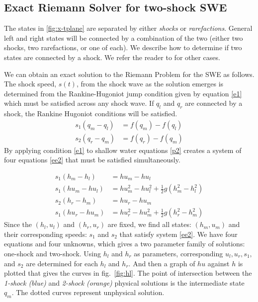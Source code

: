 \documentclass[12pt,a4paper]{article}
\begin{document}
	
	\subsection{Exact Riemann Solver for two-shock SWE}
	The states in \ref{fig:x-tplane} are separated by either {\em shocks} or {\em rarefactions}. General left and right states will be connected by a combination of the two (either two shocks, two rarefactions, or one of each).  We describe how to determine if two states are connected by a shock.  We refer the reader to \cite{leveque2002finite} for other cases. 

	We can obtain an exact solution to the Riemann Problem for the SWE as follows. 
	The shock speed, $s(t)$,  from the shock wave as the solution emerges is determined from the Rankine-Hugoniot jump condition given by equation \eqref{e1}  which must be satisfied across any shock wave.  If $q_l$ and $q_r$ are connected by a shock, the Rankine Hugoniot conditions will be satisfied. 
	\begin{equation}
	\begin{aligned}
		s_1(q_{m} - q_{l}) & = f(q_{m}) - f(q_{l}) \\
		s_2(q_{r} - q_{m}) & = f(q_{r}) - f(q_{m})
	\end{aligned}
	\label{e1}
	\end{equation}
	 By applying condition  \eqref{e1} to shallow water equations \eqref{p2}  creates a system of four equations \eqref{ee2} that must be satisfied simultaneously. 
	 
	 	\begin{equation}
	 	\begin{aligned}
	 		s_1(h_{m} - h_{l}) & = hu_{m} - hu_{l} \\
	 		s_1(hu_{m} - hu_{l})  &= hu_{m}^{2} - hu_{l}^{2} + \frac{1}{2}g(h_{m}^{2} - h_{l}^2)\\
	 		s_2(h_{r} - h_{m})  &=  hu_{r} - hu_{m}\\
	 		s_1(hu_{r} - hu_{m})  &= hu_{r}^{2} - hu_{m}^{2} + \frac{1}{2}g(h_{r}^{2} - h_{m}^2)
	 	\end{aligned}
	 	\label{ee2}
	 \end{equation}
 Since the $(h_l,u_l)$ and $(h_r,u_r)$ are fixed, we find all states: $(h_m,u_m)$  and their corresponding speeds: $s_1$ and $s_2$ that satisfy system  \eqref{ee2}. We have four equations and four unknowns, which gives a two parameter family of solutions: one-shock and two-shock. Using $h_l$ and $h_r$ as parameters, corresponding $u_l,u_r,s_1, $and $s_2$ are determined for each $h_l$ and $h_r$. And then a graph of $hu$ against $h$ is plotted that gives the curves in fig.~\ref{fig:hl}. The point of intersection between the {\em 1-shock (blue)} and  {\em2-shock (orange)} physical solutions is the intermediate state $q_m$. The dotted curves represent unphysical solution.
  
\end{document}
